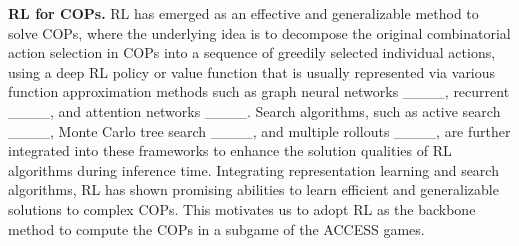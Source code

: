 
\textbf{RL for COPs.} RL has emerged as an effective and generalizable method to solve COPs, where the underlying idea is to decompose the original combinatorial action selection in COPs into a sequence of greedily selected individual actions, using a deep RL policy or value function that is usually represented via various function approximation methods such as graph neural networks ____, recurrent ____, and attention networks ____. Search algorithms, such as active search ____, Monte Carlo tree search ____, and multiple rollouts ____, are further integrated into these frameworks to enhance the solution qualities of RL algorithms during inference time. Integrating representation learning and search algorithms, RL has shown promising abilities to learn efficient and generalizable solutions to complex COPs. This motivates us to adopt RL as the backbone method to compute the COPs in a subgame of the ACCESS games.



